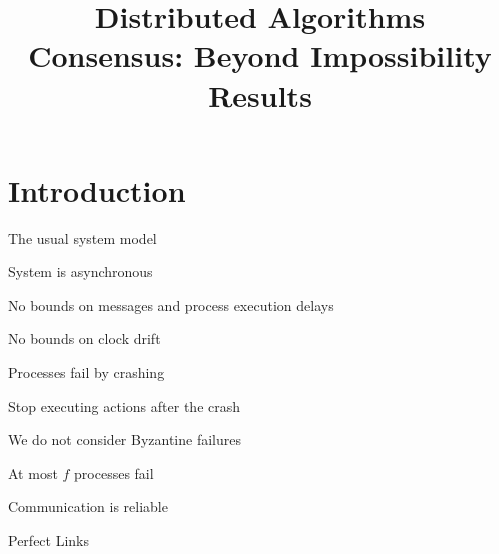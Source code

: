 
\title[DS - FD \& Consensus]{\textbf{Distributed Algorithms}\\Consensus: Beyond Impossibility Results}







\newcommand{\Crashed}{\mathit{crashed}}
\newcommand{\Correct}{\mathit{correct}}
\newcommand{\Suspected}{\mathit{suspected}}
\newcommand{\Est}{\mathit{est}}
\newcommand{\Aux}{\mathit{aux}}
\newcommand{\Rec}{\mathit{rec}}
\newcommand{\Proc}{\mathit{proc}}
\newcommand{\Stop}{\mathit{stop}}

\newcommand{\SUSPECT}{\textsc{suspect}}
\newcommand{\PHASEA}{\textsc{phase1}}
\newcommand{\PHASEB}{\textsc{phase2}}
\newcommand{\DECIDE}{\textsc{decide}}
\newcommand{\REPORT}{\textsc{report}}
\newcommand{\PROPOSAL}{\textsc{proposal}}

\newcommand{\Random}{\fontproc{random}}

\FrameTitle
\FrameContent



\section{Introduction}

\begin{frame}{The usual system model}


	
\BIL

\item \alert{System is asynchronous}
	\BI
	\item No bounds on messages and process execution delays
	\item No bounds on clock drift
	\EI
	
\item \alert{Processes fail by crashing}
	\BI
	\item Stop executing actions after the crash
	\item We do not consider Byzantine failures
	\item At most $f$ processes fail
	\EI

\item \alert{Communication is reliable}

	\BI
	\item Perfect Links
	\EI

\EIL


\end{frame}


